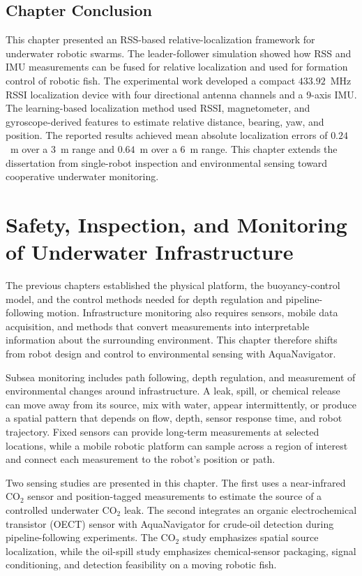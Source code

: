 \documentclass{uhcoethesis}
\begin{document}
\section{Chapter Conclusion}

This chapter presented an RSS-based relative-localization framework for underwater robotic swarms. The leader-follower simulation showed how RSS and IMU measurements can be fused for relative localization and used for formation control of robotic fish. The experimental work developed a compact $433.92$~MHz RSSI localization device with four directional antenna channels and a 9-axis IMU. The learning-based localization method used RSSI, magnetometer, and gyroscope-derived features to estimate relative distance, bearing, yaw, and position. The reported results achieved mean absolute localization errors of $0.24$~m over a 3~m range and $0.64$~m over a 6~m range. This chapter extends the dissertation from single-robot inspection and environmental sensing toward cooperative underwater monitoring.

\chapter{Safety, Inspection, and Monitoring of Underwater Infrastructure}

The previous chapters established the physical platform, the buoyancy-control model, and the control methods needed for depth regulation and pipeline-following motion. Infrastructure monitoring also requires sensors, mobile data acquisition, and methods that convert measurements into interpretable information about the surrounding environment. This chapter therefore shifts from robot design and control to environmental sensing with AquaNavigator.

Subsea monitoring includes path following, depth regulation, and measurement of environmental changes around infrastructure. A leak, spill, or chemical release can move away from its source, mix with water, appear intermittently, or produce a spatial pattern that depends on flow, depth, sensor response time, and robot trajectory. Fixed sensors can provide long-term measurements at selected locations, while a mobile robotic platform can sample across a region of interest and connect each measurement to the robot's position or path.

Two sensing studies are presented in this chapter. The first uses a near-infrared \mbox{CO$_2$} sensor and position-tagged measurements to estimate the source of a controlled underwater \mbox{CO$_2$} leak. The second integrates an organic electrochemical transistor (OECT) sensor with AquaNavigator for crude-oil detection during pipeline-following experiments. The \mbox{CO$_2$} study emphasizes spatial source localization, while the oil-spill study emphasizes chemical-sensor packaging, signal conditioning, and detection feasibility on a moving robotic fish.
\end{document}
